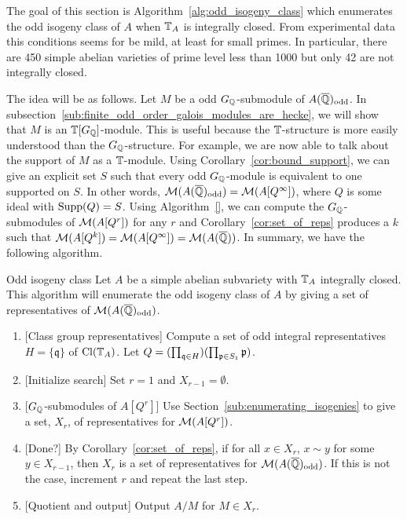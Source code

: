 \documentclass{article}
\renewcommand{\q}{\mathfrak{q}}
\newcommand{\odd}{\mathrm{odd}}
\begin{document}
The goal of this section is Algorithm~\ref{alg:odd_isogeny_class} which
enumerates the odd isogeny class of $A$ when $\mathbb{T}_A$ is integrally closed. From
experimental data this conditions seems for be mild, at least for small primes.
In particular, there are 450 simple abelian varieties of prime level less than
1000 but only 42 are not integrally closed.

The idea will be as follows. Let $M$ be a odd $G_{\mathbb{Q}}$-submodule of
$A(\QQbar)_\odd$. In
subsection~\ref{sub:finite_odd_order_galois_modules_are_hecke}, we will show
that $M$ is an $\mathbb{T}[G_{\mathbb{Q}}]$-module. This is useful because the $\mathbb{T}$-structure is more
easily understood than the $G_{\mathbb{Q}}$-structure. For example, we are now able to
talk about the support of $M$ as a $\mathbb{T}$-module. Using
Corollary~\ref{cor:bound_support}, we can give an explicit set $S$ such that
every odd $G_{\mathbb{Q}}$-module is equivalent to one supported on $S$. In other words,
$\M(A(\QQbar)_\odd)=\M(A[Q^\infty])$, where $Q$ is some ideal with
$\operatorname{Supp}(Q)=S$. Using Algorithm~\ref{}, we can compute the $G_{\mathbb{Q}}$-submodules of
$\mathcal{M}(A[Q^r])$ for any $r$ and Corollary~\ref{cor:set_of_reps} produces a $k$
such that $\mathcal{M}(A[Q^k])=\mathcal{M}(A[Q^\infty])=\mathcal{M}(A(\overline{\mathbb{Q}}))$. In summary, we have the
following algorithm.
\begin{algorithm}{Odd isogeny class}%
    \label{alg:odd_isogeny_class}
    Let $A$ be a simple abelian subvariety with $\mathbb{T}_A$ integrally closed. This
    algorithm will enumerate the odd isogeny class of $A$ by giving a set of
    representatives of $\M(A(\QQbar)_\odd)$.
    \begin{enumerate}
        \item{} [Class group representatives]
            Compute a set of odd integral representatives $H=\{\q\}$ of
            $\operatorname{Cl}(\mathbb{T}_A)$. Let $Q = (\prod_{\q\in H})(\prod_{\p\in S_1} \p)$. 
        \item{} [Initialize search]
            Set $r=1$ and $X_{r-1}=\emptyset$.
        \item{} [$G_{\mathbb{Q}}$-submodules of $A[Q^r]$]
            Use Section~\ref{sub:enumerating_isogenies} to give a set, $X_r$,
            of representatives for $\mathcal{M}(A[Q^r])$.
        \item{} [Done?]
            By Corollary~\ref{cor:set_of_reps}, if for all $x\in X_r$, $x\sim
            y$ for some $y\in X_{r-1}$, then $X_r$ is a set of representatives
            for $\M(A(\QQbar)_\odd)$. If this is not the case, increment $r$
            and repeat the last step.
        \item{} [Quotient and output]
            Output $A/M$ for $M\in X_r$.
    \end{enumerate}
\end{algorithm}
\end{document}
